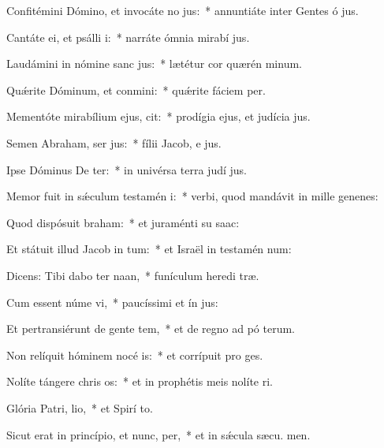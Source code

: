 \item Confitémini Dómino, et invocáte no jus:~* annuntiáte inter Gentes ó jus.
\item Cantáte ei, et psálli i:~* narráte ómnia mirabí jus.
\item Laudámini in nómine sanc jus:~* lætétur cor quærén minum.
\item Quǽrite Dóminum, et conmini:~* quǽrite fáciem  per.
\item Mementóte mirabílium ejus,  cit:~* prodígia ejus, et judícia  jus.
\item Semen Abraham, ser jus:~* fílii Jacob, e jus.
\item Ipse Dóminus De ter:~* in univérsa terra judí jus.
\item Memor fuit in sǽculum testamén i:~* verbi, quod mandávit in mille genenes:
\item Quod dispósuit  braham:~* et juraménti su  saac:
\item Et státuit illud Jacob in tum:~* et Israël in testamén num:
\item Dicens: Tibi dabo ter naan,~* funículum heredi træ.
\item Cum essent núme vi,~* paucíssimi et ín jus:
\item Et pertransiérunt de gente  tem,~* et de regno ad pó terum.
\item Non relíquit hóminem nocé is:~* et corrípuit pro  ges.
\item Nolíte tángere chris os:~* et in prophétis meis nolíte ri.
\item Glória Patri,  lio,~* et Spirí to.
\item Sicut erat in princípio, et nunc,  per,~* et in sǽcula sæcu. men.
